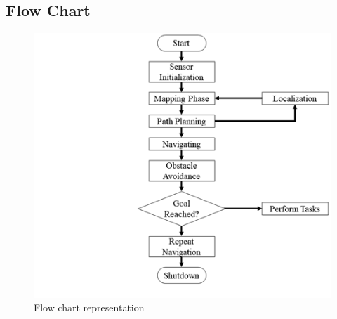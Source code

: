 \subsection{\fontsize{14}{16} Flow Chart}
	\begin{figure}[H]
		\centering
		\includegraphics{images/Content/flow_chart.png}
		\caption{Flow chart representation}
		\label{fig:fig4}
	\end{figure}

